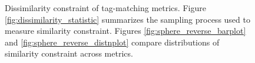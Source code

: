 \begin{figure}
\begin{center}
\caption{
Dissimilarity constraint of tag-matching metrics.
Figure \ref{fig:dissimilarity_statistic} summarizes the sampling process used to measure similarity constraint.
Figures \ref{fig:sphere_reverse_barplot} and \ref{fig:sphere_reverse_distnplot} compare distributions of similarity constraint across metrics.
}
\label{fig:sphere_reverse}

\end{center}
\end{figure}
